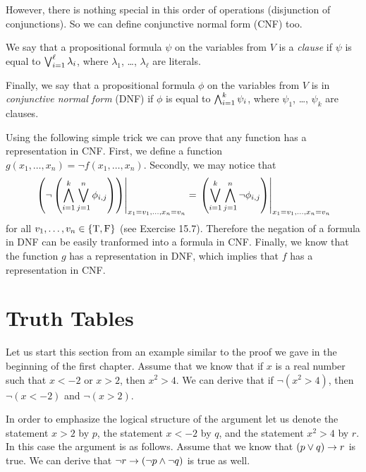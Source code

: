 However, there is nothing special in this order of operations (disjunction of
conjunctions). So we can define conjunctive normal form (CNF) too.
\begin{definition}
  We say that a propositional formula $\psi$ on the variables from $V$ is
  a \emph{clause} if $\psi$ is equal to $\bigvee_{i = 1}^\ell \lambda_i$, where
  $\lambda_1$, \dots, $\lambda_\ell$ are literals.

  Finally, we say that a propositional formula $\phi$ on the variables from
  $V$ is in \emph{conjunctive normal form} (DNF) if $\phi$ is equal to
  $\bigwedge_{i = 1}^k \psi_i$, where $\psi_1$, \dots, $\psi_k$ are
  clauses.
\end{definition}

Using the following simple trick we can prove that any function
has a representation in CNF. First, we define a function
$g(x_1, \dots, x_n) = \lnot f(x_1, \dots, x_n)$. Secondly, we may notice that
\[
  \left. {
    \left(
      \lnot
      \left(
        \bigwedge_{i = 1}^k \bigvee_{j = 1}^n \phi_{i, j}
      \right)
    \right)
  } \right\rvert_{x_1 = v_1, \dots, x_n = v_n}
  =
  \left. {
    \left(
      \bigvee_{i = 1}^k \bigwedge_{j = 1}^n \lnot \phi_{i, j}
    \right)
  } \right\rvert_{x_1 = v_1, \dots, x_n = v_n}
\]
for all $v_1, \dots, v_n \in \set{\ltrue, \lfalse}$
(see Exercise 15.7). Therefore the negation
of a formula in DNF can be easily tranformed into a formula in CNF.
Finally, we know that the function
$g$ has a representation in DNF, which implies that $f$ has a representation
in CNF.

\section{Truth Tables}
\label{section:truth-tables}

Let us start this section from an example similar to
the proof we gave in the beginning of the first chapter. Assume that we know
that if $x$ is a real number such that $x < -2$ or $x > 2$, then $x^2 > 4$. We
can derive that if $\lnot (x^2 > 4)$, then $\lnot (x < -2)$ and $\lnot (x > 2)$.

In order to emphasize the logical structure of the argument let us denote
the statement $x > 2$ by $p$, the statement $x < -2$ by $q$, and the statement
$x^2 > 4$ by $r$. In this case the argument is as follows.
Assume that we know that $(p \lor q) \rightarrow r$ is true. We
can derive that $\lnot r \rightarrow (\lnot p \land \lnot q)$ is true as well.

